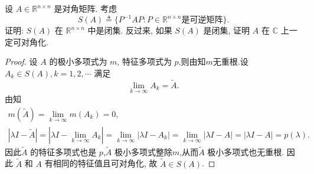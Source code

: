\documentclass[../../main.tex]{subfiles}%
\begin{document}
\begin{example}
设 \( A \in \mathbb{R}^{n \times n} \) 是对角矩阵. 考虑
\[
S(A) \triangleq \{ P^{-1}AP : P \in \mathbb{R}^{n \times n} \text{是可逆矩阵} \}.
\]
证明: \( S(A) \) 在 \( \mathbb{R}^{n \times n} \) 中是闭集. 反过来, 如果 \( S(A) \) 是闭集, 证明 \( A \) 在 \( \mathbb{C} \) 上一定可对角化.
\end{example}
\begin{proof}

设 \( A \) 的极小多项式为 \( m \), 特征多项式为 \( p \),则由知$m$无重根.设 \( A_k \in S(A), k = 1,2,\cdots \) 满足
\[
\lim_{k \to \infty} A_k = \tilde{A}.
\]
由知
\begin{gather*}
m(\tilde{A})=\lim_{k\rightarrow \infty} m(A_k)=0,
\\
\left| \lambda I-\tilde{A} \right|=\left| \lambda I-\lim_{k\rightarrow \infty} A_k \right|=\lim_{k\rightarrow \infty} \left| \lambda I-A_k \right|=\lim_{k\rightarrow \infty} \left| \lambda I-A \right|=\left| \lambda I-A \right|=p\left( \lambda \right) .
\end{gather*}
因此\( \tilde{A} \) 的特征多项式也是 \( p \),\( \tilde{A} \) 极小多项式整除$m$,从而\( \tilde{A} \) 极小多项式也无重根.  因此 \( \tilde{A} \) 和 \( A \) 有相同的特征值且可对角化, 故 \( \tilde{A} \in S(A) \).


\end{proof}
\end{document}
